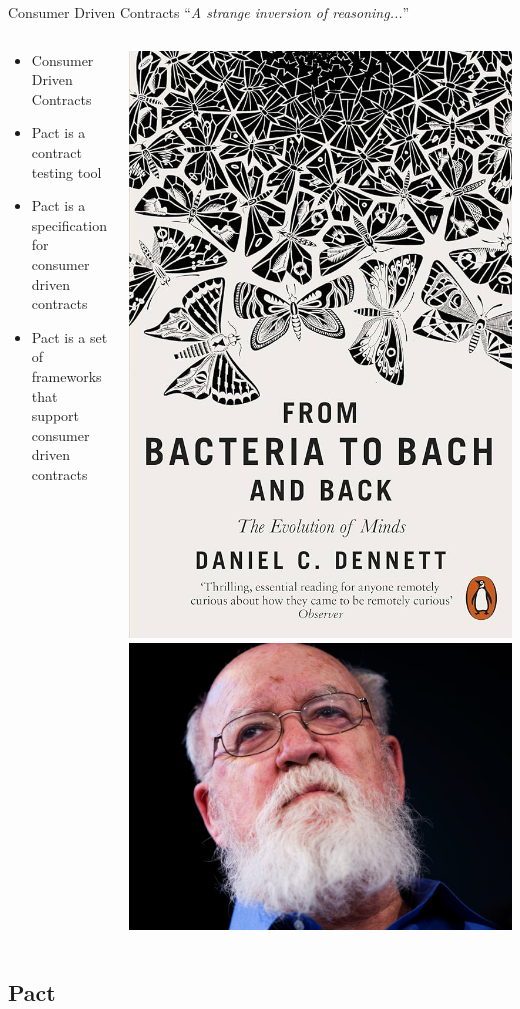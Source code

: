 \begin{frame}{Consumer Driven Contracts}
    "`\textit{A strange inversion of reasoning...}"'
    \begin{columns}
        \begin{column}{0.5\textwidth}
            \begin{itemize}
                \item Consumer Driven Contracts
                \item Pact is a contract testing tool
                \item Pact is a specification for consumer driven contracts
                \item Pact is a set of frameworks that support consumer driven contracts
            \end{itemize}
        \end{column}
        \begin{column}{0.5\textwidth}
            \begin{center}
                \includegraphics[width=.5\textwidth]{./assets/bacteria}
                \includegraphics[width=.5\textwidth]{./assets/dennet}
            \end{center}
        \end{column}

    \end{columns}
\end{frame}


\subsection{Pact}


